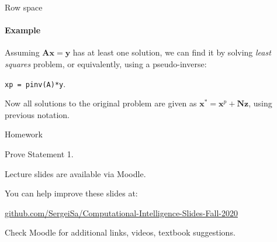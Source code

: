 \documentclass{beamer}
\begin{document}
\begin{frame}{Row space}
\framesubtitle{Example}
\begin{flushleft}

Assuming $\mathbf{A} \mathbf{x} = \mathbf{y}$ has at least one solution, we can find it by solving \emph{least squares} problem, or equivalently, using a pseudo-inverse:

\bigskip

\texttt{xp = pinv(A)*y}.

\bigskip

Now all solutions to the original problem are given as $\mathbf{x}^* = \mathbf{x}^p + \mathbf{N} \mathbf{z}$, using previous notation.

\end{flushleft}
\end{frame}



\begin{frame}{Homework}
\begin{flushleft}

Prove Statement 1.

\end{flushleft}
\end{frame}




\begin{frame}
\centerline{Lecture slides are available via Moodle.}
\bigskip
\centerline{You can help improve these slides at:}

\centerline{\href{https://github.com/SergeiSa/Computational-Intelligence-Slides-Fall-2020}{github.com/SergeiSa/Computational-Intelligence-Slides-Fall-2020}}


\bigskip
\centerline{Check Moodle for additional links, videos, textbook suggestions.}
\end{frame}
\end{document}
